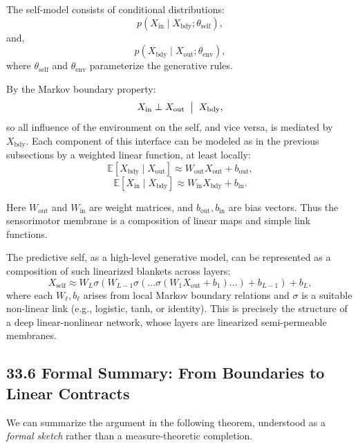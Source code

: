 \documentclass[12pt,letterpaper]{article}
\theoremstyle{remark}
\begin{document}
The self-model consists of conditional distributions:
\[
p(X_{\text{in}} \mid X_{\text{bdy}}; \theta_{\text{self}}),
\]
and,
\[
p(X_{\text{bdy}} \mid X_{\text{out}}; \theta_{\text{env}}),
\]
where $\theta_{\text{self}}$ and $\theta_{\text{env}}$ parameterize the generative rules.

By the Markov boundary property:
\[
X_{\text{in}} \perp X_{\text{out}} \;\bigm|\; X_{\text{bdy}},
\]
so all influence of the environment on the self, and vice versa, is mediated by $X_{\text{bdy}}$. Each component of this interface can be modeled as in the previous subsections by a weighted linear function, at least locally:
\[
\mathbb{E}[X_{\text{bdy}} \mid X_{\text{out}}] \approx W_{\text{out}} X_{\text{out}} + b_{\text{out}},
\]
\[
\mathbb{E}[X_{\text{in}} \mid X_{\text{bdy}}] \approx W_{\text{in}} X_{\text{bdy}} + b_{\text{in}}.
\]

Here $W_{\text{out}}$ and $W_{\text{in}}$ are weight matrices, and $b_{\text{out}}, b_{\text{in}}$ are bias vectors. Thus the sensorimotor membrane is a composition of linear maps and simple link functions.

The predictive self, as a high-level generative model, can be represented as a composition of such linearized blankets across layers:
\[
X_{\text{self}} \approx W_L \sigma(W_{L-1} \sigma(\dots \sigma(W_1 X_{\text{out}} + b_1) \dots ) + b_{L-1}) + b_L,
\]
where each $W_\ell, b_\ell$ arises from local Markov boundary relations and $\sigma$ is a suitable non-linear link (e.g., logistic, tanh, or identity). This is precisely the structure of a deep linear-nonlinear network, whose layers are linearized semi-permeable membranes.

\subsection{33.6 Formal Summary: From Boundaries to Linear Contracts}

We can summarize the argument in the following theorem, understood as a \emph{formal sketch} rather than a measure-theoretic completion.
\end{document}
